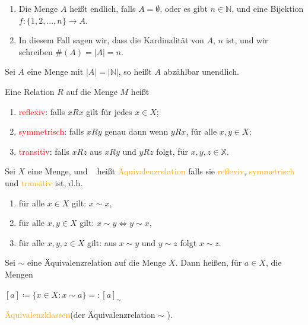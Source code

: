 \begin{definition}
\begin{enumerate}
    \item Die Menge $A$ heißt endlich, falls $A = \emptyset$, oder es gibt $n \in \mathbb{N}$, und eine Bijektion $f : \{1,2,...,n\} \rightarrow A$.
    \item In diesem Fall sagen wir, dass die Kardinalität von $A$, $n$ ist, und wir schreiben $\#(A) = |A| = n$.
\end{enumerate}
\end{definition}
\begin{definition}
Sei $A$ eine Menge mit $|A| = |\mathbb{N}|$, so heißt $A$ abzählbar unendlich.
\end{definition}
\begin{definition}
Eine Relation $R$ auf die Menge $M$ heißt
\begin{enumerate}
    \item \textcolor{red}{reflexiv}: falls $xRx$ gilt für jedes $x \in X$;
    \item \textcolor{red}{symmetrisch}: falls $xRy$ genau dann wenn $yRx$, für alle $x,y \in X$;
    \item \textcolor{red}{transitiv}: falls $xRz$ aus $xRy$ und $yRz$ folgt, für $x,y,z \in \mathbb{X}$.
\end{enumerate}
\end{definition}
\begin{definition}
Sei $X$ eine Menge, und ~ heißt \textcolor{orange}{Äquivalenzrelation} falls sie \textcolor{orange}{reflexiv}, \textcolor{orange}{symmetrisch} und \textcolor{orange}{transitiv} ist, d.h.
\begin{enumerate}
    \item für alle $x \in X$ gilt: $x \sim x$,
    \item für alle $x,y \in X$ gilt: $x \sim y \Leftrightarrow y \sim x$,
    \item für alle $x,y,z \in X$ gilt: aus $x \sim y$ und $y \sim z$ folgt $x \sim z$.
\end{enumerate}
\end{definition}
\begin{definition}
Sei $\sim$ eine Äquivalenzrelation auf die Menge $X$. Dann heißen, für $a \in X$, die Mengen
\begin{center}
$[a] \coloneqq \{x \in X : x \sim a\} =: [a]_\sim$
\end{center}
\textcolor{orange}{Äquivalenzklassen}(der Äquivalenzrelation $\sim$ ).
\end{definition}
